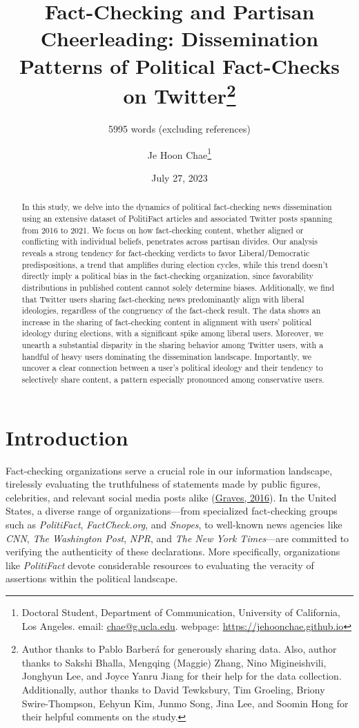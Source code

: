 \documentclass[
  12pt,
]{article}
\title{Fact-Checking and Partisan Cheerleading: Dissemination Patterns
of Political Fact-Checks on Twitter\footnote{Author thanks to Pablo
  Barberá for generously sharing data. Also, author thanks to Sakshi
  Bhalla, Mengqing (Maggie) Zhang, Nino Migineishvili, Jonghyun Lee, and
  Joyce Yanru Jiang for their help for the data collection.
  Additionally, author thanks to David Tewksbury, Tim Groeling, Briony
  Swire-Thompson, Eehyun Kim, Junmo Song, Jina Lee, and Soomin Hong for
  their helpful comments on the study.}}
\subtitle{5995 words (excluding references)}
\author{Je Hoon Chae\footnote{Doctoral Student, Department of
  Communication, University of California, Los Angeles. email:
  \href{mailto:chae@g.ucla.edu}{chae@g.ucla.edu}. webpage:
  \href{https://jehoonchae.github.io}{https://jehoonchae.github.io}}}
\date{July 27, 2023}
\begin{document}
\maketitle
\begin{abstract}
\noindent In this study, we delve into the dynamics of political
fact-checking news dissemination using an extensive dataset of
PolitiFact articles and associated Twitter posts spanning from 2016 to
2021. We focus on how fact-checking content, whether aligned or
conflicting with individual beliefs, penetrates across partisan divides.
Our analysis reveals a strong tendency for fact-checking verdicts to
favor Liberal/Democratic predispositions, a trend that amplifies during
election cycles, while this trend doesn't directly imply a political
bias in the fact-checking organization, since favorability distributions
in published content cannot solely determine biases. Additionally, we
find that Twitter users sharing fact-checking news predominantly align
with liberal ideologies, regardless of the congruency of the fact-check
result. The data shows an increase in the sharing of fact-checking
content in alignment with users' political ideology during elections,
with a significant spike among liberal users. Moreover, we unearth a
substantial disparity in the sharing behavior among Twitter users, with
a handful of heavy users dominating the dissemination landscape.
Importantly, we uncover a clear connection between a user's political
ideology and their tendency to selectively share content, a pattern
especially pronounced among conservative users.
\end{abstract}
\setlength{\parindent}{20pt}
\setlength{\parskip}{0pt}

\newpage

\doublespacing

\hypertarget{introduction}{%
\section{Introduction}\label{introduction}}

Fact-checking organizations serve a crucial role in our information
landscape, tirelessly evaluating the truthfulness of statements made by
public figures, celebrities, and relevant social media posts alike
(\protect\hyperlink{ref-graves2016}{Graves, 2016}). In the United
States, a diverse range of organizations---from specialized
fact-checking groups such as \emph{PolitiFact}, \emph{FactCheck.org},
and \emph{Snopes}, to well-known news agencies like \emph{CNN},
\emph{The Washington Post}, \emph{NPR}, and \emph{The New York
Times}---are committed to verifying the authenticity of these
declarations. More specifically, organizations like \emph{PolitiFact}
devote considerable resources to evaluating the veracity of assertions
within the political landscape.
\end{document}
